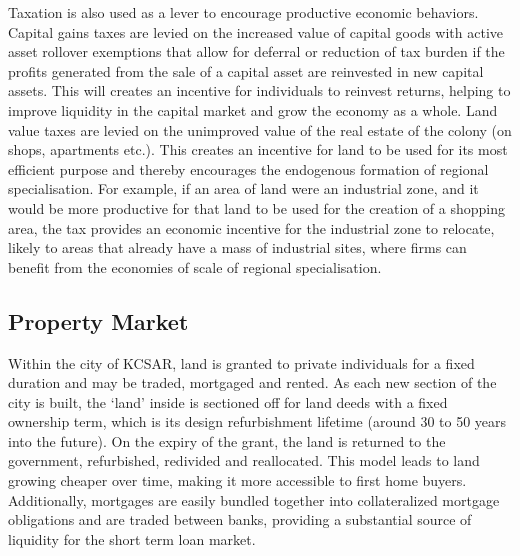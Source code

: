\documentclass[fleqn,10pt]{Stylesheet} %
\begin{document}
Taxation is also used as a lever to encourage productive economic behaviors. Capital gains taxes are levied on the increased value of capital goods with active asset rollover exemptions that allow for deferral or reduction of tax burden if the profits generated from the sale of a capital asset are reinvested in new capital assets. This will creates an incentive for individuals to reinvest returns, helping to improve liquidity in the capital market and grow the economy as a whole. Land value taxes are levied on the unimproved value of the real estate of the colony (on shops, apartments etc.). This creates an incentive for land to be used for its most efficient purpose and thereby encourages the endogenous formation of regional specialisation. For example, if an area of land were an industrial zone, and it would be more productive for that land to be used for the creation of a shopping area, the tax provides an economic incentive for the industrial zone to relocate, likely to areas that already have a mass of industrial sites, where firms can benefit from the economies of scale of regional specialisation.

\subsection{Property Market}
Within the city of KCSAR, land is granted to private individuals for a fixed duration and may be traded, mortgaged and rented. As each new section of the city is built, the ‘land’ inside is sectioned off for land deeds with a fixed ownership term, which is its design refurbishment lifetime (around 30 to 50 years into the future). On the expiry of the grant, the land is returned to the government, refurbished, redivided and reallocated. This model leads to land growing cheaper over time, making it more accessible to first home buyers. Additionally, mortgages are easily bundled together into collateralized mortgage obligations and are traded between banks, providing a substantial source of liquidity for the short term loan market.
\end{document}
